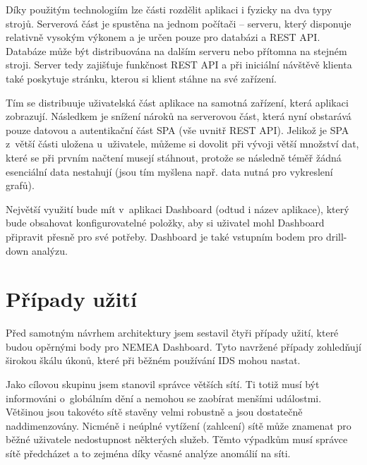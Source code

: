 Díky použitým technologiím lze části rozdělit aplikaci i fyzicky na dva typy strojů. Serverová část je spustěna na jednom počítači -- serveru, který disponuje relativně vysokým výkonem a je určen pouze pro databázi a REST API. Databáze může být distribuována na dalším serveru nebo přítomna na stejném stroji. Server tedy zajišťuje funkčnost REST API a při iniciální návštěvě klienta také poskytuje stránku, kterou si klient stáhne na své zařízení.

Tím se distribuuje uživatelská část aplikace na samotná zařízení, která aplikaci zobrazují. Následkem je snížení nároků na serverovou část, která nyní obstarává pouze datovou a autentikační část SPA (vše uvnitř REST API). Jelikož je SPA z~větší části uložena u~uživatele, můžeme si dovolit při vývoji větší množství dat, které se při prvním načtení musejí stáhnout, protože se následně téměř žádná esenciální data nestahují (jsou tím myšlena např. data nutná pro vykreslení grafů).

Největší využití bude mít v~aplikaci Dashboard (odtud i název aplikace), který bude obsahovat konfigurovatelné položky, aby si uživatel mohl Dashboard připravit přesně pro své potřeby. Dashboard je také vstupním bodem pro drill-down analýzu.

\section{Případy užití}
Před samotným návrhem architektury jsem sestavil čtyři případy užití, které budou opěrnými body pro NEMEA Dashboard. Tyto navržené případy zohledňují širokou škálu úkonů, které při běžném používání IDS mohou nastat.

Jako cílovou skupinu jsem stanovil správce větších sítí. Ti totiž musí být informováni o~globálním dění a nemohou se zaobírat menšími událostmi. Většinou jsou takovéto sítě stavěny velmi robustně a jsou dostatečně naddimenzovány. Nicméně i neúplné vytížení (zahlcení) sítě může znamenat pro běžné uživatele nedostupnost některých služeb. Těmto výpadkům musí správce sítě předcházet a to zejména díky včasné analýze anomálií na síti.

\label{sec:aud}

